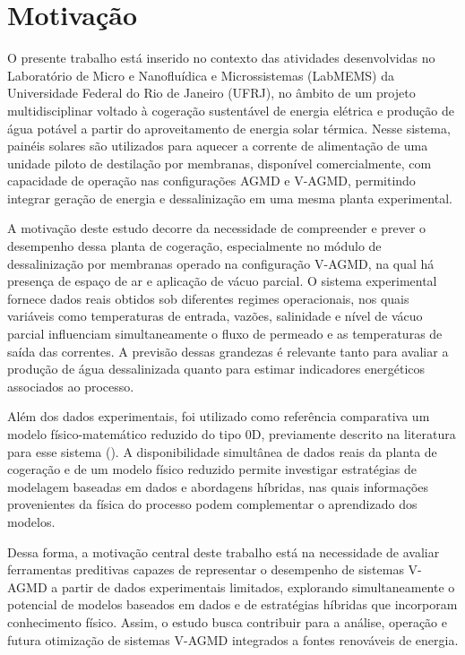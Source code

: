 \section{Motivação}

O presente trabalho está inserido no contexto das atividades desenvolvidas no Laboratório de Micro e Nanofluídica e Microssistemas (LabMEMS) da Universidade Federal do Rio de Janeiro (UFRJ), no âmbito de um projeto multidisciplinar voltado à cogeração sustentável de energia elétrica e produção de água potável a partir do aproveitamento de energia solar térmica. Nesse sistema, painéis solares são utilizados para aquecer a corrente de alimentação de uma unidade piloto de destilação por membranas, disponível comercialmente, com capacidade de operação nas configurações AGMD e V-AGMD, permitindo integrar geração de energia e dessalinização em uma mesma planta experimental.

A motivação deste estudo decorre da necessidade de compreender e prever o desempenho dessa planta de cogeração, especialmente no módulo de dessalinização por membranas operado na configuração V-AGMD, na qual há presença de espaço de ar e aplicação de vácuo parcial. O sistema experimental fornece dados reais obtidos sob diferentes regimes operacionais, nos quais variáveis como temperaturas de entrada, vazões, salinidade e nível de vácuo parcial influenciam simultaneamente o fluxo de permeado e as temperaturas de saída das correntes. A previsão dessas grandezas é relevante tanto para avaliar a produção de água dessalinizada quanto para estimar indicadores energéticos associados ao processo.

Além dos dados experimentais, foi utilizado como referência comparativa um modelo físico-matemático reduzido do tipo 0D, previamente descrito na literatura para esse sistema (\cite{Lisboa2024}). A disponibilidade simultânea de dados reais da planta de cogeração e de um modelo físico reduzido permite investigar estratégias de modelagem baseadas em dados e abordagens híbridas, nas quais informações provenientes da física do processo podem complementar o aprendizado dos modelos.

Dessa forma, a motivação central deste trabalho está na necessidade de avaliar ferramentas preditivas capazes de representar o desempenho de sistemas V-AGMD a partir de dados experimentais limitados, explorando simultaneamente o potencial de modelos baseados em dados e de estratégias híbridas que incorporam conhecimento físico. Assim, o estudo busca contribuir para a análise, operação e futura otimização de sistemas V-AGMD integrados a fontes renováveis de energia.

